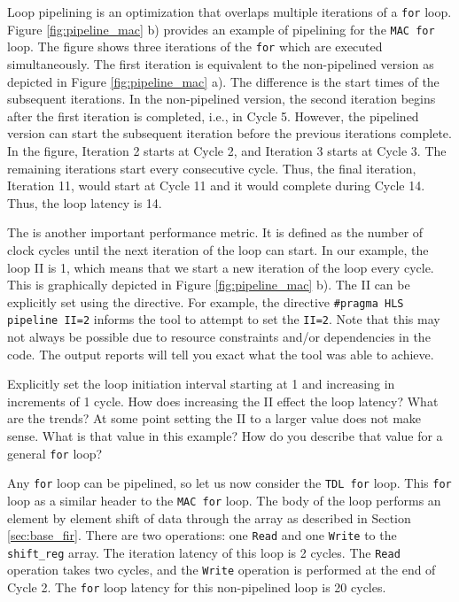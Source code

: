 Loop pipelining is an optimization that overlaps multiple iterations of a \lstinline{for} loop. Figure \ref{fig:pipeline_mac} b) provides an example of pipelining for the \lstinline{MAC for} loop. The figure shows three iterations of the \lstinline{for} which are executed simultaneously. The first iteration is equivalent to the non-pipelined version as depicted in Figure \ref{fig:pipeline_mac} a). The difference is the start times of the subsequent iterations. In the non-pipelined version, the second iteration begins after the first iteration is completed, i.e., in Cycle 5. However, the pipelined version can start the subsequent iteration before the previous iterations complete. In the figure, Iteration 2 starts at Cycle 2, and Iteration 3 starts at Cycle 3. The remaining iterations start every consecutive cycle. Thus, the final iteration, Iteration 11, would start at Cycle 11 and it would complete during Cycle 14. Thus, the loop latency is 14.

The  is another important performance metric. It is defined as the number of clock cycles until the next iteration of the loop can start. In our example, the loop II is 1, which means that we start a new iteration of the loop every cycle. This is graphically depicted in Figure \ref{fig:pipeline_mac} b). The II can be explicitly set using the directive. For example, the directive \lstinline{#pragma HLS pipeline II=2} informs the \VHLS tool to attempt to set the \lstinline{II=2}. Note that this may not always be possible due to resource constraints and/or dependencies in the code. The output reports will tell you exact what the \VHLS tool was able to achieve. 

\begin{exercise}
Explicitly set the loop initiation interval starting at 1 and increasing in increments of 1 cycle. How does increasing the II effect the loop latency? What are the trends?  At some point setting the II to a larger value does not make sense. What is that value in this example? How do you describe that value for a general \lstinline{for} loop?
\end{exercise}



Any \lstinline{for} loop can be pipelined, so let us now consider the \lstinline{TDL for} loop. This \lstinline{for} loop as a similar header to the \lstinline{MAC for} loop. The body of the loop performs an element by element shift of data through the array as described in Section \ref{sec:base_fir}. There are two operations: one \lstinline{Read} and one \lstinline{Write} to the \lstinline{shift_reg} array. The iteration latency of this loop is 2 cycles. The \lstinline{Read} operation takes two cycles, and the \lstinline{Write} operation is performed at the end of Cycle 2. The \lstinline{for} loop latency for this non-pipelined loop is 20 cycles.

